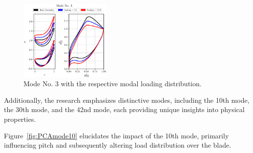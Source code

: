 \documentclass[11pt,a4paper,twocolumn]{article}
\newcommand\widthPCA{0.4}
\begin{document}
\begin{figure}[!h]
    \centering
    \includegraphics[width=\widthPCA\textwidth]{./images/mode03.eps}
    \caption{Mode No. 3 with the respective modal loading distribution.}
    \label{fig:PCAmode3}
\end{figure} 


Additionally, the research emphasizes distinctive modes, including the 10th mode, the 30th mode, and the 42nd mode, each providing unique insights into physical properties.

Figure~\ref{fig:PCAmode10} elucidates the impact of the 10th mode, primarily influencing pitch and subsequently altering load distribution over the blade.
\end{document}
